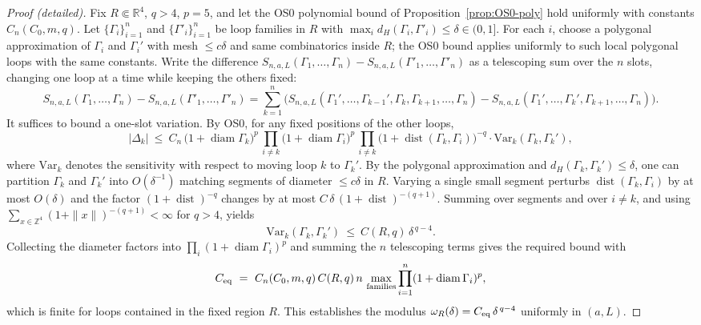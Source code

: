 \documentclass[11pt]{amsart}
\theoremstyle{plain}
\theoremstyle{definition}
\theoremstyle{remark}
\begin{document}
\begin{proof}[Proof (detailed)]
Fix $R\Subset\mathbb R^4$, $q>4$, $p=5$, and let the OS0 polynomial bound of Proposition~\ref{prop:OS0-poly} hold uniformly with constants $C_n(C_0,m,q)$. Let $\{\Gamma_i\}_{i=1}^n$ and $\{\Gamma'_i\}_{i=1}^n$ be loop families in $R$ with $\max_i d_H(\Gamma_i,\Gamma'_i)\le \delta\in(0,1]$. For each $i$, choose a polygonal approximation of $\Gamma_i$ and $\Gamma_i'$ with mesh $\le c\delta$ and same combinatorics inside $R$; the OS0 bound applies uniformly to such local polygonal loops with the same constants.
Write the difference $S_{n,a,L}(\Gamma_1,\dots,\Gamma_n)-S_{n,a,L}(\Gamma'_1,\dots,\Gamma'_n)$ as a telescoping sum over the $n$ slots, changing one loop at a time while keeping the others fixed:
\[
  S_{n,a,L}(\Gamma_1,\dots,\Gamma_n)-S_{n,a,L}(\Gamma'_1,\dots,\Gamma'_n)
   =\sum_{k=1}^n \big( S_{n,a,L}(\Gamma_1',\dots,\Gamma_{k-1}',\Gamma_k,\Gamma_{k+1},\dots,\Gamma_n)
   - S_{n,a,L}(\Gamma_1',\dots,\Gamma_{k}',\Gamma_{k+1},\dots,\Gamma_n)\big).
\]
It suffices to bound a one-slot variation. By OS0, for any fixed positions of the other loops,
\[
  \big|\Delta_k\big|\ \le\ C_n\,\big(1+\operatorname{diam}\Gamma_k\big)^p\,\prod_{i\ne k}\big(1+\operatorname{diam}\Gamma_i\big)^p\,\prod_{i\ne k}\big(1+\operatorname{dist}(\Gamma_k,\Gamma_i)\big)^{-q}
   \cdot \mathrm{Var}_k(\Gamma_k,\Gamma_k'),
\]
where $\mathrm{Var}_k$ denotes the sensitivity with respect to moving loop $k$ to $\Gamma_k'$. By the polygonal approximation and $d_H(\Gamma_k,\Gamma_k')\le \delta$, one can partition $\Gamma_k$ and $\Gamma_k'$ into $O(\delta^{-1})$ matching segments of diameter $\le c\delta$ in $R$. Varying a single small segment perturbs $\operatorname{dist}(\Gamma_k,\Gamma_i)$ by at most $O(\delta)$ and the factor $(1+\operatorname{dist})^{-q}$ changes by at most $C\,\delta\,(1+\operatorname{dist})^{-(q+1)}$. Summing over segments and over $i\ne k$, and using $\sum_{x\in \mathbb Z^4}(1+\|x\|)^{-(q+1)}<\infty$ for $q>4$, yields
\[
  \mathrm{Var}_k(\Gamma_k,\Gamma_k')\ \le\ C(R,q)\,\delta^{\,q-4}.
\]
Collecting the diameter factors into $\prod_i (1+\operatorname{diam}\Gamma_i)^p$ and summing the $n$ telescoping terms gives the required bound with
\[
  C_{\rm eq}\ =\ C_n(C_0,m,q)\,C(R,q)\,n\,\max_{\text{families}}\prod_{i=1}^n (1+\operatorname{diam}\Gamma_i)^p,
\]
which is finite for loops contained in the fixed region $R$. This establishes the modulus $\omega_R(\delta)=C_{\rm eq}\,\delta^{\,q-4}$ uniformly in $(a,L)$.
\end{proof}
\end{document}
